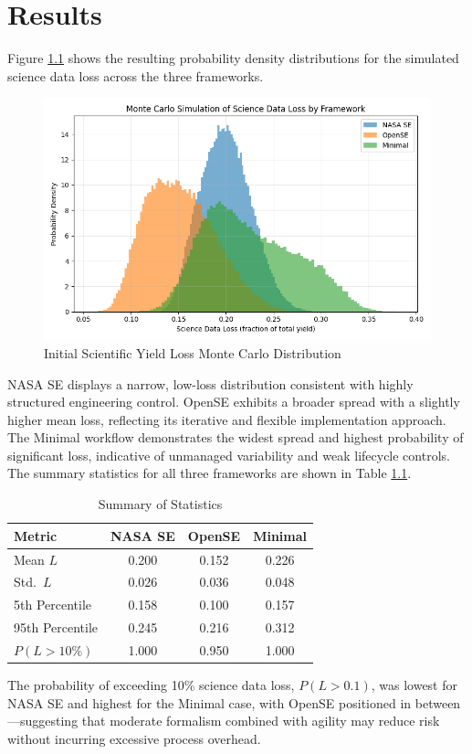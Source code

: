 \chapter{Results}
\label{chapter:results}

Figure \ref{fig:initial} shows the resulting probability density distributions for the simulated science data loss across the three frameworks. \\
\begin{figure}[h!]
  \centering
  \includegraphics[width=0.9\linewidth]{figures/initial_distribution.png}
  \caption{Initial Scientific Yield Loss Monte Carlo Distribution}
  \label{fig:initial}
\end{figure}

NASA SE displays a narrow, low-loss distribution consistent with highly structured engineering control. OpenSE exhibits a broader spread with a slightly higher mean loss, reflecting its iterative and flexible implementation approach. The Minimal workflow demonstrates the widest spread and highest probability of significant loss, indicative of unmanaged variability and weak lifecycle controls.\\

The summary statistics for all three frameworks are shown in Table \ref{tab:results_summary}. \\
\begin{table}[htbp]
  \centering
  \caption{Summary of Statistics}
  \label{tab:results_summary}
  \begin{tabular}{lccc}
    \toprule
    \textbf{Metric} & \textbf{NASA SE} & \textbf{OpenSE} & \textbf{Minimal} \\
    \midrule
    Mean $L$             & 0.200 & 0.152 & 0.226 \\
    Std.\ $L$            & 0.026 & 0.036 & 0.048 \\
    5th Percentile       & 0.158 & 0.100 & 0.157 \\
    95th Percentile      & 0.245 & 0.216 & 0.312 \\
    $P(L > 10\%)$        & 1.000 & 0.950 & 1.000 \\
    \bottomrule
  \end{tabular}
\end{table}

The probability of exceeding 10\% science data loss, $P(L>0.1)$, was lowest for NASA SE and highest for the Minimal case, with OpenSE positioned in between—suggesting that moderate formalism combined with agility may reduce risk without incurring excessive process overhead.
